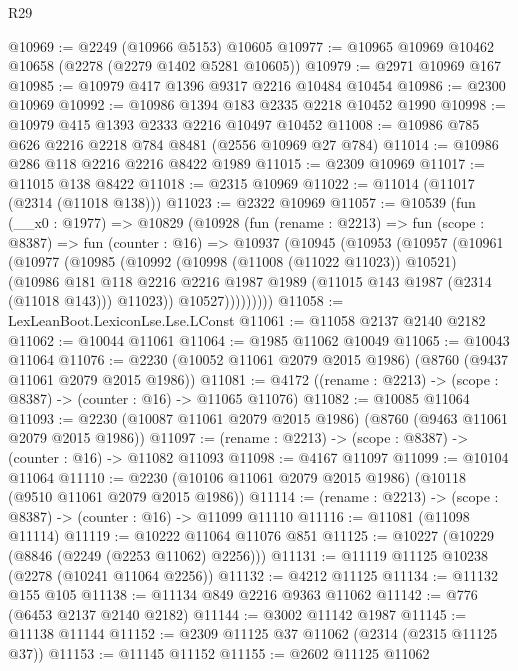 \begin{lexlean}{R29}
\begin{coremodule}
@10969 := @2249 (@10966 @5153) @10605
@10977 := @10965 @10969 @10462 @10658 (@2278 (@2279 @1402 @5281 @10605))
@10979 := @2971 @10969 @167
@10985 := @10979 @417 @1396 @9317 @2216 @10484 @10454
@10986 := @2300 @10969
@10992 := @10986 @1394 @183 @2335 @2218 @10452 @1990
@10998 := @10979 @415 @1393 @2333 @2216 @10497 @10452
@11008 := @10986 @785 @626 @2216 @2218 @784 @8481 (@2556 @10969 @27 @784)
@11014 := @10986 @286 @118 @2216 @2216 @8422 @1989
@11015 := @2309 @10969
@11017 := @11015 @138 @8422
@11018 := @2315 @10969
@11022 := @11014 (@11017 (@2314 (@11018 @138)))
@11023 := @2322 @10969
@11057 := @10539
    (fun (__x0 : @1977) =>
    @10829
      (@10928
        (fun (rename : @2213) =>
        fun (scope : @8387) =>
        fun (counter : @16) =>
        @10937
          (@10945
            (@10953
              (@10957
                (@10961
                  (@10977
                    (@10985
                      (@10992
                        (@10998 (@11008 (@11022 @11023)) @10521)
                        (@10986
                          @181
                          @118
                          @2216
                          @2216
                          @1987
                          @1989
                          (@11015 @143 @1987 (@2314 (@11018 @143)))
                          @11023))
                      @10527)))))))))
@11058 := LexLeanBoot.LexiconLse.Lse.LConst
@11061 := @11058 @2137 @2140 @2182
@11062 := @10044 @11061
@11064 := @1985 @11062 @10049
@11065 := @10043 @11064
@11076 := @2230 (@10052 @11061 @2079 @2015 @1986) (@8760 (@9437 @11061 @2079 @2015 @1986))
@11081 := @4172 ((rename : @2213) -> (scope : @8387) -> (counter : @16) -> @11065 @11076)
@11082 := @10085 @11064
@11093 := @2230 (@10087 @11061 @2079 @2015 @1986) (@8760 (@9463 @11061 @2079 @2015 @1986))
@11097 := (rename : @2213) -> (scope : @8387) -> (counter : @16) -> @11082 @11093
@11098 := @4167 @11097
@11099 := @10104 @11064
@11110 := @2230 (@10106 @11061 @2079 @2015 @1986) (@10118 (@9510 @11061 @2079 @2015 @1986))
@11114 := (rename : @2213) -> (scope : @8387) -> (counter : @16) -> @11099 @11110
@11116 := @11081 (@11098 @11114)
@11119 := @10222 @11064 @11076 @851
@11125 := @10227 (@10229 (@8846 (@2249 (@2253 @11062) @2256)))
@11131 := @11119 @11125 @10238 (@2278 (@10241 @11064 @2256))
@11132 := @4212 @11125
@11134 := @11132 @155 @105
@11138 := @11134 @849 @2216 @9363 @11062
@11142 := @776 (@6453 @2137 @2140 @2182)
@11144 := @3002 @11142 @1987
@11145 := @11138 @11144
@11152 := @2309 @11125 @37 @11062 (@2314 (@2315 @11125 @37))
@11153 := @11145 @11152
@11155 := @2602 @11125 @11062

\end{coremodule}
\end{lexlean}
